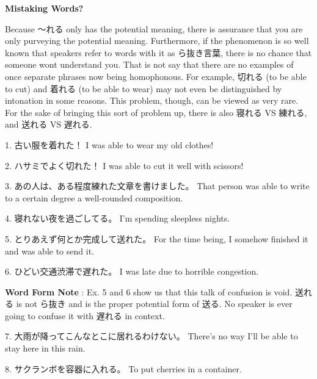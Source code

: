 \begin{center}
 \textbf{Mistaking Words? }
\end{center}

\par{ Because ～れる only has the potential meaning, there is assurance that you are only purveying the potential meaning. Furthermore, if the phenomenon is so well known that speakers refer to words with it as ら抜き言葉, there is no chance that someone won\textquotesingle t understand you. That is not say that there are no examples of once separate phrases now being homophonous. For example, 切れる (to be able to cut) and 着れる (to be able to wear) may not even be distinguished by intonation in some reasons. This problem, though, can be viewed as very rare. For the sake of bringing this sort of problem up, there is also 寝れる VS 練れる, and 送れる VS 遅れる.  }

\par{1. 古い服を着れた！ \hfill\break
I was able to wear my old clothes! }

\par{2. ハサミでよく切れた！ \hfill\break
I was able to cut it well with scissors! }

\par{3. あの人は、ある程度練れた文章を書けました。 \hfill\break
That person was able to write to a certain degree a well-rounded composition. }

\par{4. 寝れない夜を過ごしてる。 \hfill\break
I'm spending sleepless nights. }

\par{5. とりあえず何とか完成して送れた。 \hfill\break
For the time being, I somehow finished it and was able to send it.  }

\par{6. ひどい交通渋滞で遅れた。 \hfill\break
I was late due to horrible congestion. }

\par{\textbf{Word Form Note }: Ex. 5 and 6 show us that this talk of confusion is void. 送れる is not ら抜き and is the proper potential form of 送る. No speaker is ever going to confuse it with 遅れる in context. }

\par{7. 大雨が降ってこんなとこに居れるわけない。 \hfill\break
There's no way I'll be able to stay here in this rain. }

\par{8. サクランボを容器に入れる。 \hfill\break
To put cherries in a container. }


